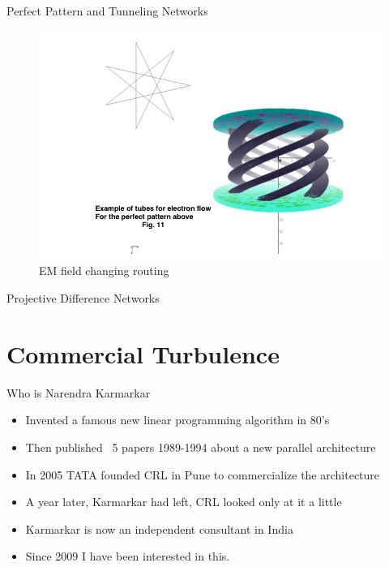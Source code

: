 \documentclass{beamer}
\begin{document}
\begin{frame}{Perfect Pattern and Tunneling Networks}
\begin{figure}
\includegraphics[scale=0.41]{cylinder-pattern.png}
\caption{EM field changing routing}
\end{figure}
\end{frame}

\begin{frame}{Projective Difference Networks}




\end{frame}



\section{Commercial Turbulence}

\begin{frame}{Who is Narendra Karmarkar}
\begin{itemize}
\item Invented a famous new linear programming algorithm in 80's
\item Then published ~5 papers 1989-1994 about a new parallel architecture
\item In 2005 TATA founded CRL in Pune to commercialize the architecture
\item A year later, Karmarkar had left, CRL looked only at it a little
\item Karmarkar is now an independent consultant in India
\item Since 2009 I have been interested in this. 
\end{itemize}
\end{frame}
\end{document}

